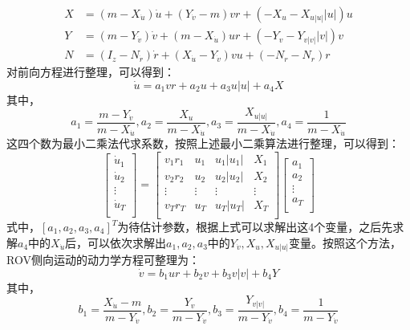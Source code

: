 \begin{equation}
\begin{aligned}
X & =(m-X_{\dot{u}})\dot{u}+ (Y_{\dot{v}}-m)vr+(-X_u-X_{u|u|}|u|)u \\
Y & =(m-Y_{\dot{v}})\dot{v}+(m-X_{\dot{u}})ur+(-Y_v-Y_{v|v|}|v|)v \\
N & =(I_z-N_{\dot{r}})\dot{r}+(X_{\dot{u}}-Y_{\dot{v}})vu+(-N_r-N_{r})r 
\end{aligned}
\end{equation}
对前向方程进行整理，可以得到：
\begin{equation}
    \dot{u}=a_1vr+a_2u+a_3u|u|+a_4X
\end{equation}
其中，
\begin{equation}
    a_1=\frac{m-Y_{\dot{v}}}{m-X_{\dot{u}}},a_2=\frac{X_u}{m-X_{\dot{u}}},a_3=\frac{X_{u|u|}}{m-X_{\dot{u}}},a_4=\frac{1}{m-X_{\dot{u}}}
\end{equation}
这四个数为最小二乘法代求系数，按照上述最小二乘算法进行整理，可以得到：
\begin{equation}
    \begin{bmatrix}
    \dot{u}_1 \\
    \dot{u}_2 \\
    \vdots \\
    \dot{u}_T \\
    \end{bmatrix}
    =
    \begin{bmatrix}
    v_1r_1 & u_1 & u_1|u_1| & X_1 \\
    v_2r_2 & u_2 & u_2|u_2| & X_2 \\
    \vdots & \vdots & \vdots & \vdots \\
    v_Tr_T & u_T & u_T|u_T| & X_T \\
    \end{bmatrix}
    \begin{bmatrix}
    a_1 \\
    a_2 \\
    \vdots \\
    a_T \\
    \end{bmatrix}
\end{equation}
式中，$[a_1,a_2,a_3,a_4]^T$为待估计参数，根据上式可以求解出这4个变量，之后先求解$a_4$中的$X_{\dot{u}}$后，可以依次求解出$a_1,a_2,a_3$中的$Y_{\dot{v}},X_u,X_{u|u| }$变量。按照这个方法，ROV侧向运动的动力学方程可整理为：
\begin{equation}
    \dot{v}=b_1ur+b_2v+b_3v|v|+b_4Y
\end{equation}
其中，
\begin{equation}
    b_1=\frac{X_{\dot{u}}-m}{m-Y_{\dot{v}}},b_2=\frac{Y_v}{m-Y_{\dot{v}}},b_3=\frac{Y_{v|v|}}{m-Y_{\dot{v}}},b_4=\frac{1}{m-Y_{\dot{v}}}
\end{equation}

